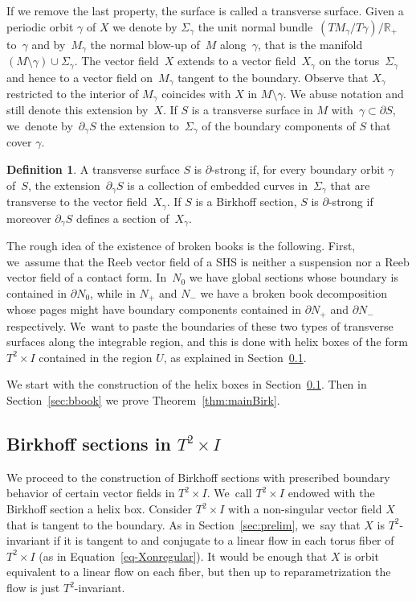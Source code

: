\documentclass[10pt]{amsart}
\theoremstyle{definition}
\newtheorem{defi}[theorem]{Definition}
\newcommand\R{\mathbb{R}}
\begin{document}
If we remove the last property, the surface is called a transverse surface. Given a periodic orbit $\gamma$ of $X$ we denote by $\Sigma_\gamma$ the unit normal bundle~$(TM_\gamma/T\gamma)/\R_+$ to~$\gamma$ and by~$M_\gamma$ the normal blow-up of~$M$ along~$\gamma$, that is the manifold~$(M\setminus\gamma)\cup \Sigma_\gamma$.
The vector field~$X$ extends to a vector field~$X_\gamma$ on the torus~$\Sigma_\gamma$ and hence to a vector field on~$M_\gamma$ tangent to the boundary. Observe that $X_\gamma$ restricted to the interior of $M_\gamma$ coincides with $X$ in $M\setminus \gamma$.
We abuse notation and still denote this extension by~$X$.
If $S$ is a transverse surface in $M$ with~$\gamma \subset \partial S$, we~denote by~$\partial_\gamma S$ the extension to~$\Sigma_\gamma$ of the boundary components of $S$ that cover $\gamma$.

\begin{defi}\label{defn-strong}
A transverse surface $S$ is $\partial$-strong if, for every boundary orbit $\gamma$ of~$S$, the extension~$\partial_\gamma S$ is a collection of embedded curves in~$\Sigma_\gamma$ that are transverse to the vector field~$X_\gamma$.
If $S$ is a Birkhoff section, $S$ is $\partial$-strong if moreover $\partial_\gamma S$ defines a section of~$X_\gamma$.
\end{defi}

The rough idea of the existence of broken books is the following. First, we~assume that the Reeb vector field of a SHS is neither a suspension nor a Reeb vector field of a contact form. In~$N_0$ we have global sections whose boundary is contained in $\partial N_0$, while in $N_+$ and $N_-$ we have a broken book decomposition whose pages might have boundary components contained in $\partial N_+$ and $\partial N_-$ respectively. We~want to paste the boundaries of these two types of transverse surfaces along the integrable region, and this is done with helix boxes of the form $T^2\times I$ contained in the region $U$, as explained in Section~\ref{sec:gluing}.

We start with the construction of the helix boxes
in Section~\ref{sec:gluing}. Then in Section~\ref{sec:bbook} we prove Theorem~\ref{thm:mainBirk}.

\subsection{Birkhoff sections in $T^2\times I$}\label{sec:gluing}

We proceed to the construction of Birkhoff sections with prescribed boundary behavior of certain vector fields in $T^2\times I$. We~call $T^2\times I$ endowed with the Birkhoff section a helix box. Consider $T^2\times I$ with a non-singular vector field $X$ that is tangent to the boundary. As in Section~\ref{sec:prelim}, we~say that $X$ is $T^2$-invariant if it is tangent to and conjugate to a linear flow in each torus fiber of $T^2\times I$ (as in Equation~\eqref{eq-Xonregular}). It would be enough that $X$ is orbit equivalent to a linear flow on each fiber, but then up to reparametrization the flow is just $T^2$-invariant.
\end{document}
